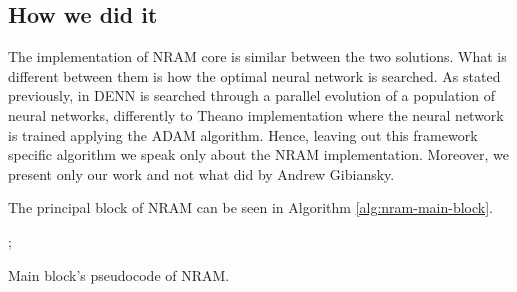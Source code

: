 \subsection{How we did it}
The implementation of NRAM core is similar between the two solutions. What is different between them is how the optimal neural network is searched. As stated previously, in DENN is searched through a parallel evolution of a population of neural networks, differently to Theano implementation where the neural network is trained applying the ADAM algorithm. Hence, leaving out this framework specific algorithm we speak only about the NRAM implementation. Moreover, we present only our work and not what did by Andrew Gibiansky.

The principal block of NRAM can be seen in Algorithm \ref{alg:nram-main-block}. 

\begin{algorithm}
	\begin{algorithmic}[1]
            ;
				\Else
				\EndIf
				
                
                \EndFor
                
			\EndFor{}
		\EndFunction
	\end{algorithmic}
	\caption{Main block's pseudocode of NRAM.}\label{alg:nram-main-block}
\end{algorithm}

